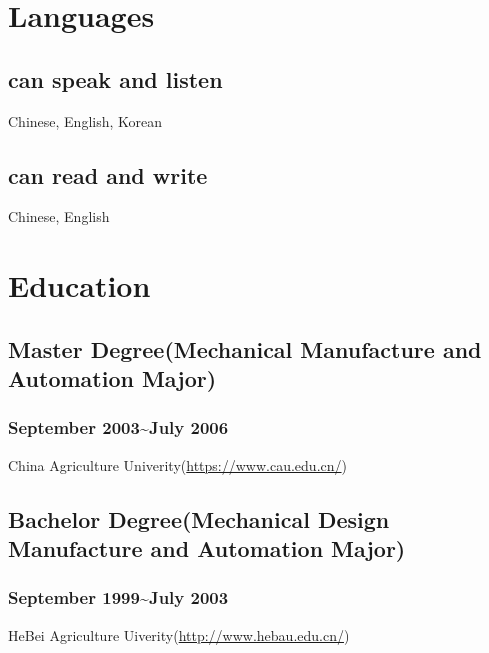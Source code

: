 \documentclass{article}
\begin{document}
\section{Languages}

\subsection{can speak and listen}
Chinese, English, Korean

\subsection{can read and write}
Chinese, English


\section{Education}

\subsection{Master Degree(Mechanical Manufacture and Automation Major)}
\subsubsection{September 2003\~{}July 2006}
China Agriculture Univerity(\url{https://www.cau.edu.cn/})

\subsection{Bachelor Degree(Mechanical Design Manufacture and Automation Major)}
\subsubsection{September 1999\~{}July 2003}
HeBei Agriculture Uiverity(\url{http://www.hebau.edu.cn/})

\end{document}
